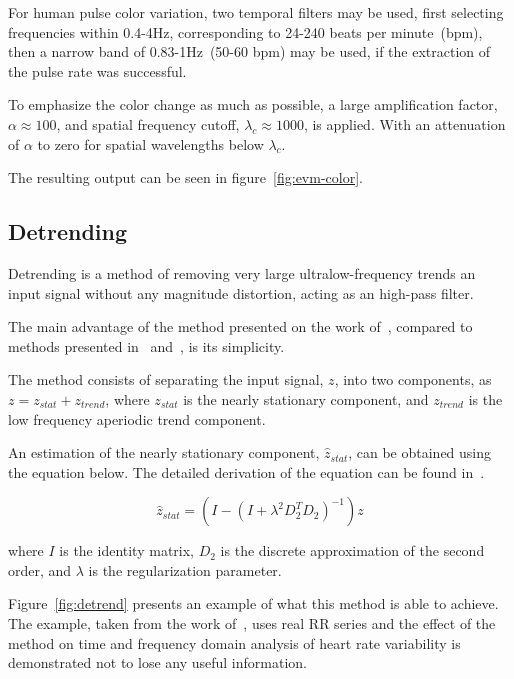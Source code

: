 For human pulse color variation, two temporal filters may be used, first
selecting frequencies within 0.4-4Hz, corresponding to 24-240 beats per
minute~(bpm), then a narrow band of 0.83-1Hz~(50-60 bpm) may be used,
if the extraction of the pulse rate was successful.

To emphasize the color change as much as possible, a large amplification
factor, $\alpha \approx 100$, and spatial frequency cutoff,
$\lambda_c \approx 1000$, is applied. With an attenuation of $\alpha$ to
zero for spatial wavelengths below $\lambda_c$.

The resulting output can be seen in figure~\ref{fig:evm-color}.

\subsection{Detrending} \label{sec:sota:post:detrend}

Detrending is a method of removing very large ultralow-frequency trends an
input signal without any magnitude distortion, acting as an high-pass filter.

The main advantage of the method presented on the work
of~\cite{Tarvainen2002Advanced}, compared to methods presented
in~\cite{Litvack1995Time} and~\cite{Porges1990Analysis}, is its simplicity.

The method consists of separating the input signal, $z$, into two components,
as $z = z_{stat} + z_{trend}$, where $z_{stat}$ is the nearly stationary
component, and $z_{trend}$ is the low frequency aperiodic trend component.

An estimation of the nearly stationary component, $\hat{z}_{stat}$, can
be obtained using the equation below. The detailed derivation of the equation
can be found in~\cite{Tarvainen2002Advanced}.

\begin{equation}
  \hat{z}_{stat} = (I - (I + \lambda^2 D_2^T D_2)^{-1}) z
\end{equation}

where $I$ is the identity matrix, $D_2$ is the discrete approximation of the
second order, and $\lambda$ is the regularization parameter.


Figure~\ref{fig:detrend} presents an example of what this method is able to
achieve. The example, taken from the work of~\cite{Tarvainen2002Advanced}, uses
real RR series and the effect of the method on time and frequency domain
analysis of heart rate variability is demonstrated not to lose any useful
information.

